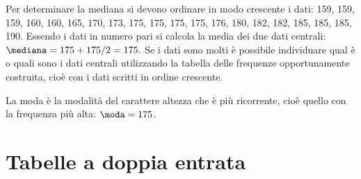 \begin{exrig}
\begin{esempio}
Per determinare la mediana si devono ordinare in modo crescente i dati:
159, 159, 159, 160, 160, 165, 170, 173, 175, 175, 175, 175, 176, 180, 182, 
182, 185, 185, 185, 190.
Essendo i dati in numero pari si calcola la media dei due dati centrali:
$\mediana = {175+175}/{2}=175.$
Se i dati sono molti è possibile individuare qual è o quali sono i dati 
centrali utilizzando la tabella delle
frequenze opportunamente costruita, cioè con i dati scritti in ordine 
crescente.

La moda è la modalità del carattere altezza che è più ricorrente, cioè 
quello con la frequenza più alta:
$\moda = 175$.
\end{esempio}
\end{exrig}



\section{Tabelle a doppia entrata}
\label{sec:c_stat_doppia_entrata}

